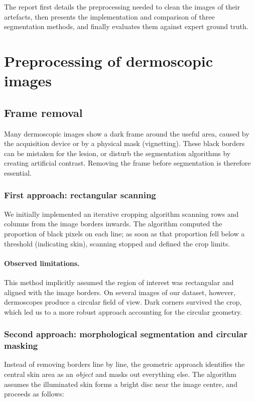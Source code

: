 \documentclass[11pt,a4paper]{article}
\begin{document}
The report first details the preprocessing needed to clean the images of their
artefacts, then presents the implementation and comparison of three segmentation
methods, and finally evaluates them against expert ground truth.

\section{Preprocessing of dermoscopic images}

\subsection{Frame removal}
\label{sec:frame-removal}

Many dermoscopic images show a dark frame around the useful area, caused by the
acquisition device or by a physical mask (vignetting). These black borders can
be mistaken for the lesion, or disturb the segmentation algorithms by creating
artificial contrast. Removing the frame before segmentation is therefore
essential.

\subsubsection{First approach: rectangular scanning}

We initially implemented an iterative cropping algorithm scanning rows and
columns from the image borders inwards. The algorithm computed the proportion of
black pixels on each line; as soon as that proportion fell below a threshold
(indicating skin), scanning stopped and defined the crop limits.

\paragraph{Observed limitations.} This method implicitly assumed the region of
interest was rectangular and aligned with the image borders. On several images
of our dataset, however, dermoscopes produce a circular field of view. Dark
corners survived the crop, which led us to a more robust approach accounting for
the circular geometry.

\subsubsection{Second approach: morphological segmentation and circular masking}

Instead of removing borders line by line, the geometric approach identifies the
central skin area as an \emph{object} and masks out everything else. The
algorithm assumes the illuminated skin forms a bright disc near the image
centre, and proceeds as follows:
\end{document}
